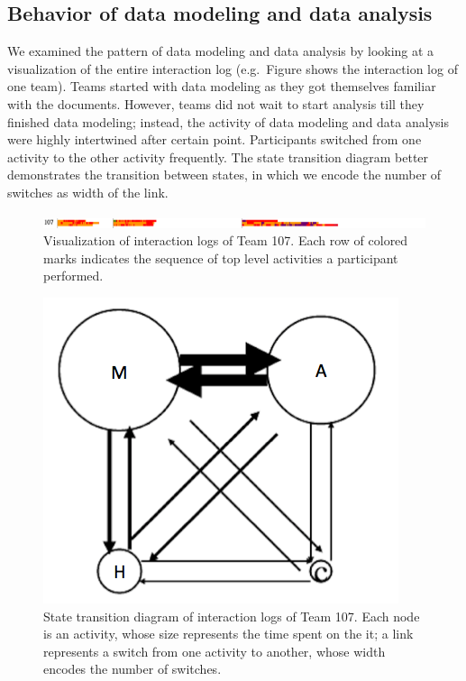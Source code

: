 \documentclass[]{article}
\begin{document}
\subsection{Behavior of data modeling and data
analysis}\label{behavior-of-data-modeling-and-data-analysis}

We examined the pattern of data modeling and data analysis by looking at
a visualization of the entire interaction log (e.g.~Figure
\autocite{fig:sequence} shows the interaction log of one team). Teams
started with data modeling as they got themselves familiar with the
documents. However, teams did not wait to start analysis till they
finished data modeling; instead, the activity of data modeling and data
analysis were highly intertwined after certain point. Participants
switched from one activity to the other activity frequently. The state
transition diagram \autocite{fig:transition} better demonstrates the
transition between states, in which we encode the number of switches as
width of the link.

\begin{figure}
\centering
\includegraphics{./Log_analysis/action_sequence_vis/G107.png}
\caption{Visualization of interaction logs of Team 107. Each row of
colored marks indicates the sequence of top level activities a
participant performed.\label{fig:sequence}}
\end{figure}

\begin{figure}
\centering
\includegraphics{./Log_analysis/state_transition/activity_transition-G107.png}
\caption{State transition diagram of interaction logs of Team 107. Each
node is an activity, whose size represents the time spent on the it; a
link represents a switch from one activity to another, whose width
encodes the number of switches.\label{fig:transition}}
\end{figure}
\end{document}
